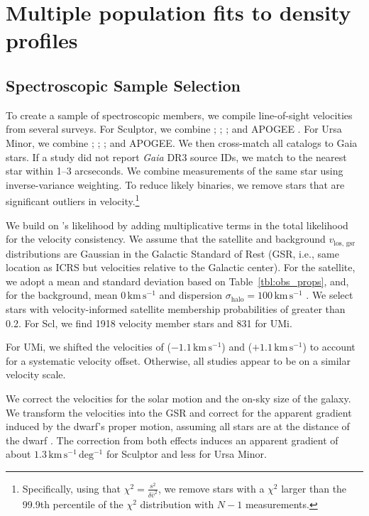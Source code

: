 \documentclass[linenumbers, twocolumn, twocolappendix]{aastex701}
\newcommand{\kms}{\mathrm{km\,s^{-1}}}
\newcommand{\jj}{\citetalias{jensen+2024}}
\begin{document}

\section{Multiple population fits to density profiles} \label{sec:double_exp_fits}

\subsection{Spectroscopic Sample Selection} 
To create a sample of spectroscopic members, we compile line-of-sight velocities from
several surveys. For
Sculptor, we combine \citet{tolstoy+2023}; \citet{walker+2009};
\citet{sestito+2023a}; and APOGEE \citep[DR17,][]{abdurrouf+2022}. For
Ursa Minor, we combine \citet{spencer+2018}; \citet{pace+2020};
\citet{sestito+2023b}; and APOGEE. We then cross-match all catalogs to
\jj{} Gaia stars. If a study did not report \textit{Gaia} DR3 source IDs,
we match to the nearest star within 1--3 arcseconds. We combine
measurements of the same star using inverse-variance weighting. To
reduce likely binaries, we remove stars that are significant outliers in velocity.\footnote{Specifically, using that
  $\chi^2=\frac{s^2}{\delta \bar v^2}$, we remove stars with a
  $\chi^2$ larger than the 99.9th percentile of the $\chi^2$
  distribution with $N-1$ measurements.}

We build on \jj{}'s likelihood by adding multiplicative terms in the
total likelihood for the velocity consistency. We assume that the satellite and
background $v_\text{los, gsr}$ distributions are Gaussian in the
Galactic Standard of Rest (GSR, i.e., same location as ICRS but
velocities relative to the Galactic center). For the satellite, we adopt
a mean and standard deviation based on
Table~\ref{tbl:obs_props}, and, for the
background, mean $0\,\kms$ and dispersion
$\sigma_\text{halo} = 100\,\kms$ \citep[e.g.][]{brown+2010}. We select
stars with velocity-informed satellite membership probabilities of
greater than 0.2. For Scl, we find 1918 velocity member stars and 831 for UMi.

For UMi, we shifted the velocities of \citet{spencer+2018}
($-1.1\,\kms$) and \citet{pace+2020} ($+1.1\,\kms$) to account for
a systematic velocity offset. Otherwise, all studies appear to be on a
similar velocity scale.

We correct the velocities for the solar motion and the on-sky size of
the galaxy. We transform the velocities into the GSR and correct for the
apparent gradient induced by the dwarf's proper motion, assuming all stars are at the distance of the dwarf \citep[see,][]{WMO2008, strigari2010}. The
correction from both effects induces an apparent gradient of about
$1.3\,\mathrm{km\,s^{-1}\,deg^{-1}}$ for Sculptor and less for Ursa Minor. 
\end{document}

